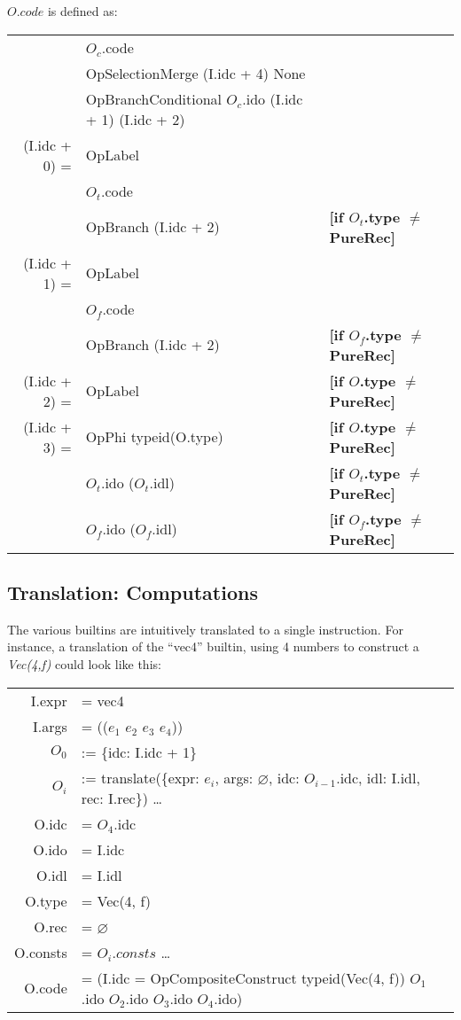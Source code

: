 \documentclass[letterpaper,12pt]{article}
\begin{document}
\medskip
$O.code$ is defined as: \\
\begin{tabularx}{\linewidth}{rll}
	& $O_c$.code \\
	& OpSelectionMerge (I.idc + 4) None \\
	& OpBranchConditional $O_c$.ido (I.idc + 1) (I.idc + 2) \\
	\cline{1-2}
	(I.idc + 0) = &OpLabel \\
	& $O_t$.code \\
	& OpBranch (I.idc + 2) & \textbf{[if $O_t$.type $\neq$ PureRec]} \\
	\cline{1-2}
	(I.idc + 1) = &OpLabel \\
	& $O_f$.code \\
	& OpBranch (I.idc + 2) & \textbf{[if $O_f$.type $\neq$ PureRec]} \\
	\cline{1-2}
	(I.idc + 2) = &OpLabel & \textbf{[if $O$.type $\neq$ PureRec]} \\
	(I.idc + 3) = &OpPhi typeid(O.type) & \textbf{[if $O$.type $\neq$ PureRec]} \\
		& \quad $O_t$.ido ($O_t$.idl) & \quad \textbf{[if $O_t$.type $\neq$ PureRec]} \\
		& \quad $O_f$.ido ($O_f$.idl) & \quad \textbf{[if $O_f$.type $\neq$ PureRec]} \\
\end{tabularx}

\subsection{Translation: Computations}

The various builtins are intuitively translated to a single instruction.
For instance, a translation of the ``vec4'' builtin, using
4 numbers to construct a \textit{Vec(4,f)} could look like this:

\medskip
\begin{tabularx}{\linewidth}{rl}
	I.expr &= vec4 \\
	I.args &= (($e_1$ $e_2$ $e_3$ $e_4$)) \\
	$O_0$ &:= \{idc: I.idc + 1\} \\
	$O_i$ &:= translate(\{expr: $e_i$, args: $\varnothing$, idc: $O_{i - 1}$.idc, idl: I.idl, rec: I.rec\}) \dots \\
	O.idc &= $O_4$.idc \\
	O.ido &= I.idc \\
	O.idl &= I.idl \\
	O.type &= Vec(4, f) \\
	O.rec &= $\varnothing$ \\
	O.consts &= $O_i.consts$ \dots \\
	O.code &= (I.idc = OpCompositeConstruct typeid(Vec(4, f)) $O_1$.ido $O_2$.ido $O_3$.ido $O_4$.ido) \\
\end{tabularx}
\end{document}
